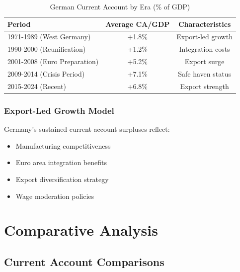 \documentclass[11pt,a4paper]{article}
\begin{document}
\begin{table}[h]
\centering
\caption{German Current Account by Era (\% of GDP)}
\begin{tabular}{lcc}
\toprule
\textbf{Period} & \textbf{Average CA/GDP} & \textbf{Characteristics} \\
\midrule
1971-1989 (West Germany) & +1.8\% & Export-led growth \\
1990-2000 (Reunification) & +1.2\% & Integration costs \\
2001-2008 (Euro Preparation) & +5.2\% & Export surge \\
2009-2014 (Crisis Period) & +7.1\% & Safe haven status \\
2015-2024 (Recent) & +6.8\% & Export strength \\
\bottomrule
\end{tabular}
\end{table}

\subsubsection{Export-Led Growth Model}
Germany's sustained current account surpluses reflect:
\begin{itemize}
    \item Manufacturing competitiveness
    \item Euro area integration benefits
    \item Export diversification strategy
    \item Wage moderation policies
\end{itemize}

\section{Comparative Analysis}

\subsection{Current Account Comparisons}
\end{document}
